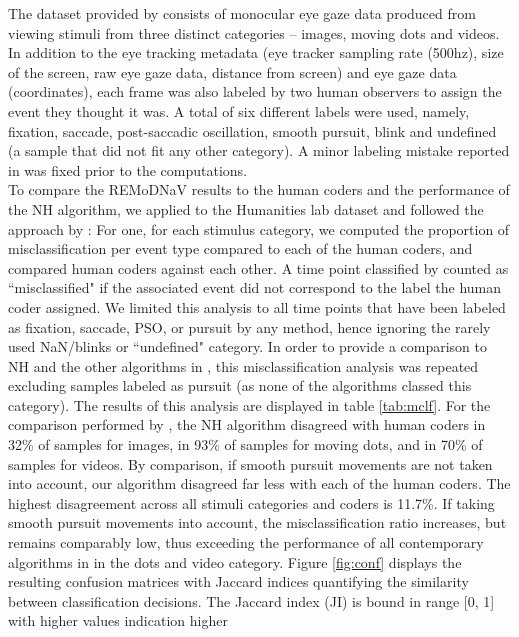     The dataset provided by \cite{Andersson2017} consists of monocular eye gaze data produced from viewing stimuli from
    three distinct categories -- images, moving dots and videos. In addition to the eye tracking metadata (eye tracker
    sampling rate (500hz), size of the screen, raw eye gaze data, distance from screen) and eye gaze data (coordinates),
    each frame was also labeled by two human observers to assign the event they thought it was. A total of six different
    labels were used, namely, fixation, saccade, post-saccadic oscillation, smooth pursuit, blink and undefined (a sample
    that did not fit any other category). A minor labeling mistake reported in \cite{Zemblys2018} was fixed prior to the
    computations. \\
    To compare the REMoDNaV results to the human coders and the performance of the NH algorithm, we applied \remodnav to
    the Humanities lab dataset and followed the approach by \citet{Andersson2017}: For one, for each stimulus category,
    we computed the proportion of misclassification per event type compared to each of the human coders, and compared
    human coders against each other. A time point classified by \remodnav counted as ``misclassified" if the associated
    event did not correspond to the label the human coder assigned. We limited this analysis to all time points that
    have been labeled as fixation, saccade, PSO, or pursuit by any method, hence ignoring the rarely used NaN/blinks or
    ``undefined" category. In order to provide a comparison to NH and the other algorithms in \cite{Andersson2017}, this
    misclassification analysis was repeated excluding samples labeled as pursuit (as none of the algorithms classed this
    category). The results of this analysis are displayed in table \ref{tab:mclf}. For the comparison performed by
    \citet{Andersson2017}, the NH algorithm disagreed with human coders in 32\% of samples for images, in 93\% of samples
    for moving dots, and in 70\% of samples for videos. By comparison, if smooth pursuit movements are not taken into
    account, our algorithm disagreed far less with each of the human coders. The highest disagreement across all stimuli
    categories and coders is 11.7\%. If taking smooth pursuit movements into account, the misclassification ratio increases,
    but remains comparably low, thus exceeding the performance of all contemporary algorithms in \citet{Andersson2017}
    in the dots and video category. Figure \ref{fig:conf} displays the resulting confusion matrices with Jaccard indices
    quantifying the similarity between classification decisions.  The Jaccard index (JI) is bound in range [0, 1] with higher values indication higher
